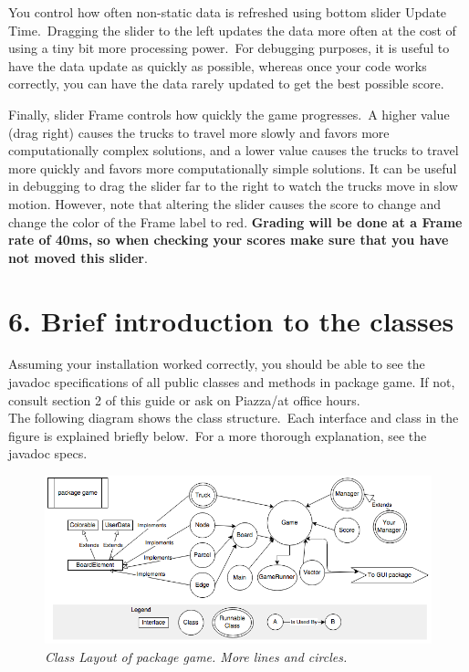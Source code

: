 \documentclass[11pt]{article}
\begin{document}
You control how often non-static data is refreshed using bottom slider Update Time.\ Dragging the slider to the left updates the data more often at the cost of using a tiny bit more processing 
power.\ For debugging purposes, it is useful to have the data update as quickly as possible, whereas once your code works correctly, you can have the data rarely updated to get the best possible score.

Finally, slider  Frame controls how quickly the game progresses.\ A higher value (drag right) causes the trucks to travel more slowly and favors more computationally complex solutions, and a lower value causes the trucks to travel more quickly and favors more computationally simple solutions. It can be useful in debugging to drag the slider far to the right to watch the trucks move in slow motion. However, note that altering the slider causes the score to change and change the color of the Frame label to red. \textbf{Grading will be done at a Frame rate of 40ms, so when checking your scores make sure that you have not moved this slider}.


\section{6. Brief introduction to the classes}
Assuming your installation worked correctly, you should be able to see the javadoc specifications of all public classes and methods in package game.
If not, consult section 2 of this guide or ask on Piazza/at office hours.\\

The following diagram shows the class structure.\ Each interface and class in the figure is explained briefly below.\ For a more thorough explanation, see the javadoc specs.
\begin{figure}[h]
\centerline{\includegraphics[scale=0.7]{hirearchy.png}} 
\caption{\em{Class Layout of package game. More lines and circles.}}
\end{figure}
\end{document}
